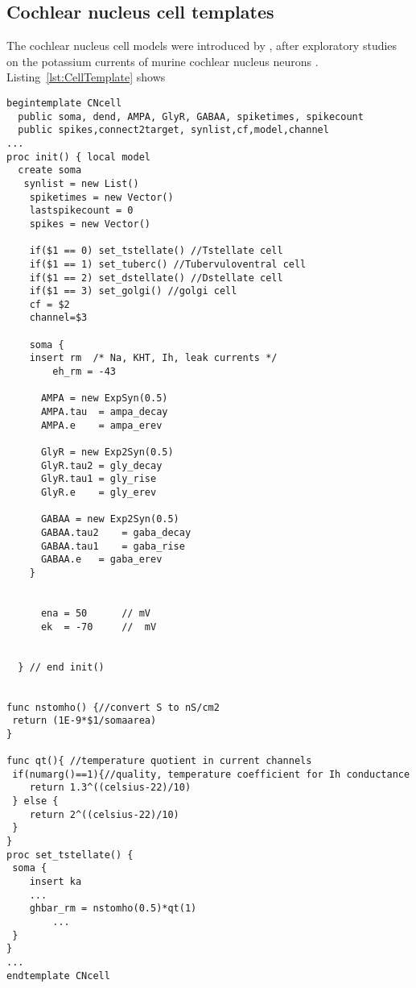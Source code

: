 \begin{appendix}
\subsection{Cochlear nucleus cell templates}

The cochlear nucleus cell models were introduced by \citet{RothmanManis:2003b}, after exploratory studies on the potassium currents of murine cochlear nucleus neurons \citep{RothmanManis:2003,RothmanManis:2003a}. Listing~\ref{lst:CellTemplate}  shows 

\begin{lstlisting}[label=lst:CellTemplate,caption=Rothman and Manis cochlear nucleus cell template (in CNcell.tem)]
begintemplate CNcell
  public soma, dend, AMPA, GlyR, GABAA, spiketimes, spikecount
  public spikes,connect2target, synlist,cf,model,channel
...
proc init() { local model
  create soma
   synlist = new List()
    spiketimes = new Vector()
    lastspikecount = 0
    spikes = new Vector()
    
    if($1 == 0) set_tstellate() //Tstellate cell
    if($1 == 1) set_tuberc() //Tubervuloventral cell
    if($1 == 2) set_dstellate() //Dstellate cell
    if($1 == 3) set_golgi() //golgi cell
    cf = $2
    channel=$3

    soma {
	insert rm  /* Na, KHT, Ih, leak currents */
        eh_rm = -43 

      AMPA = new ExpSyn(0.5)
      AMPA.tau  = ampa_decay
      AMPA.e 	= ampa_erev

      GlyR = new Exp2Syn(0.5)
      GlyR.tau2	= gly_decay
      GlyR.tau1	= gly_rise
      GlyR.e 	= gly_erev

      GABAA = new Exp2Syn(0.5)
      GABAA.tau2 	= gaba_decay
      GABAA.tau1 	= gaba_rise
      GABAA.e 	= gaba_erev
    }


      ena = 50		// mV
      ek  = -70		//  mV


  }	// end init()


func nstomho() {//convert S to nS/cm2
 return (1E-9*$1/somaarea)
}

func qt(){ //temperature quotient in current channels
 if(numarg()==1){//quality, temperature coefficient for Ih conductance	
 	return 1.3^((celsius-22)/10)
 } else {
	return 2^((celsius-22)/10)
 }
}
proc set_tstellate() {
 soma {
	insert ka
	...
	ghbar_rm = nstomho(0.5)*qt(1)
        ...  
 }
}
...
endtemplate CNcell 

\end{lstlisting}


\end{appendix}


